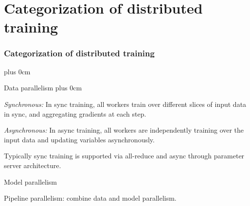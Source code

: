 \documentclass[11pt]{beamer}
\renewcommand{\raggedright}{\leftskip=0pt \rightskip=0pt plus 0cm}
\let\olditemize=\itemize
\renewenvironment{itemize}{\olditemize\raggedright}{\endlist}
\begin{document}
\section{Categorization of distributed training}
\frame{\tableofcontents[currentsection]}
\begin{frame}
\frametitle{Categorization of distributed training}
\begin{itemize}
	\item Data parallelism
	\begin{itemize}
	\item \textit{Synchronous:} In sync training, all workers train over different slices of input data in sync, and aggregating gradients at each step.
	\item \textit{Asynchronous:} In async training, all workers are independently training over the input data and updating variables asynchronously.
	\item Typically sync training is supported via all-reduce and async through parameter server architecture.
	\end{itemize}
	\item Model parallelism
	\item Pipeline parallelism: combine data and model parallelism.
\end{itemize}
\end{frame}
\end{document}
